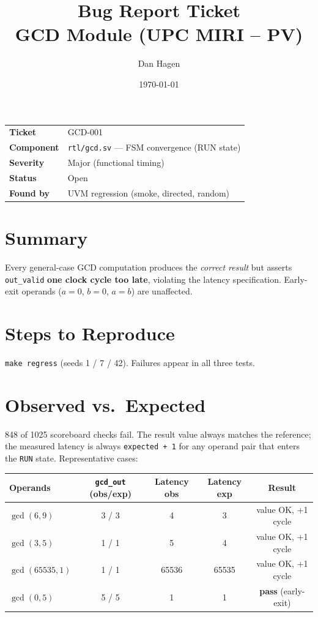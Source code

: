 \documentclass[11pt,a4paper]{article}
\title{Bug Report Ticket \\ \large GCD Module (UPC MIRI -- PV)}
\author{Dan Hagen}
\date{\today}
\begin{document}
\maketitle
\vspace{-1.5em}

\begin{table}[H]
\centering
\begin{tabular}{ll}
\textbf{Ticket} & GCD-001 \\
\textbf{Component} & \texttt{rtl/gcd.sv} --- FSM convergence (RUN state) \\
\textbf{Severity} & Major (functional timing) \\
\textbf{Status} & Open \\
\textbf{Found by} & UVM regression (smoke, directed, random) \\
\end{tabular}
\end{table}

\section*{Summary}
Every general-case GCD computation produces the \emph{correct result} but asserts
\texttt{out\_valid} \textbf{one clock cycle too late}, violating the latency
specification. Early-exit operands ($a=0$, $b=0$, $a=b$) are unaffected.

\section*{Steps to Reproduce}
\texttt{make regress} (seeds 1 / 7 / 42). Failures appear in all three tests.

\section*{Observed vs.\ Expected}
848 of 1025 scoreboard checks fail. The result value always matches the reference;
the measured latency is always \texttt{expected + 1} for any operand pair that
enters the \texttt{RUN} state. Representative cases:

\begin{table}[H]
\centering
\small
\begin{tabular}{lcccc}
\toprule
Operands & \texttt{gcd\_out} (obs/exp) & Latency obs & Latency exp & Result \\
\midrule
$\gcd(6,9)$       & 3 / 3 & 4      & 3      & value OK, +1 cycle \\
$\gcd(3,5)$       & 1 / 1 & 5      & 4      & value OK, +1 cycle \\
$\gcd(65535,1)$   & 1 / 1 & 65536  & 65535  & value OK, +1 cycle \\
$\gcd(0,5)$       & 5 / 5 & 1      & 1      & \textbf{pass} (early-exit) \\
\bottomrule
\end{tabular}
\end{table}
\end{document}

